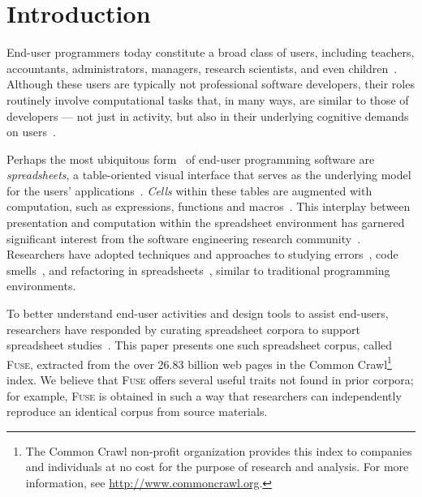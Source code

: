 \documentclass[conference]{IEEEtran}
\begin{document}

\section{Introduction}

End-user programmers today constitute a broad class of users, including teachers, accountants, administrators, managers, research scientists, and even children~\cite{Ko2011}.
%
Although these users are typically not professional software developers, their roles routinely involve computational tasks that, in many ways, are similar to those of developers --- not just in activity, but also in their underlying cognitive demands on users~\cite{Blackwell2002}. 

Perhaps the most ubiquitous form~\cite{Scaffidi2005} of end-user programming software are \emph{spreadsheets}, a table-oriented visual interface that serves as the underlying model for the users' applications~\cite{Nardi1990}. \emph{Cells} within these tables are augmented with computation, such as expressions, functions and macros~\cite{Nardi1990}. 
This interplay between presentation and computation within the spreadsheet environment has garnered significant interest from the software engineering research community~\cite{Burnett2009}. 
Researchers have adopted techniques and approaches to studying errors~\cite{Powell2008}, code smells~\cite{Pinzger2012}, and refactoring in spreadsheets~\cite{Badame2012}, similar to traditional programming environments. 


To better understand end-user activities and design tools to assist end-users, researchers have responded by curating spreadsheet corpora to support spreadsheet studies~\cite{Fisher2005,Hermans2015,Chen2013}. 
%
This paper presents one such spreadsheet corpus, called \textsc{Fuse}, extracted from the over 26.83 billion web pages in the Common Crawl\footnote{The Common Crawl non-profit organization provides this index to companies and individuals at no cost for the purpose of research and analysis. For more information, see \url{http://www.commoncrawl.org}.} index. 
%
We believe that \textsc{Fuse} offers several useful traits not found in prior corpora; 
for example, \textsc{Fuse} is obtained in such a way that researchers can independently reproduce an identical corpus from source materials.
\end{document}
